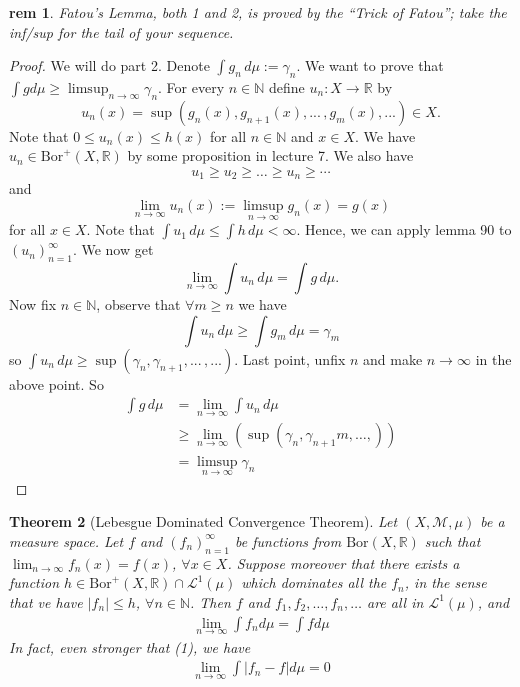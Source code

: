 \documentclass[letterpaper, 12pt]{article}
\newcommand{\fin}{\qquad \quad \hfill \framebox[1.75mm][l]{\,}}
\newcommand{\bR}{\mathbb{R}}
\newcommand{\bN}{\mathbb{N}}
\newcommand{\Bor}{\mathrm{Bor}}
\theoremstyle{stdthm}
\newtheorem{thm}{Theorem}[section]
\theoremstyle{stddef}
\newtheorem{rem}[thm]{rem} %
\theoremstyle{stdnonum}
\theoremstyle{stdqands}
\theoremstyle{stdbold}
\begin{document}
\begin{rem}
Fatou's Lemma, both 1 and 2, is proved by the ``Trick of Fatou''; take the inf/sup for the tail of your sequence. 
\end{rem}


\begin{proof}
We will do part 2. Denote $\int g_n \, d\mu := \gamma_n$. We want to prove that $\int g d\mu \geq \limsup_{n\rightarrow \infty} \gamma_n$. For every $n \in \bN$ define $u_n:X \rightarrow \bR$ by 
\[
u_n(x) = \sup(g_n(x), g_{n+1}(x),...\, , g_m(x),...) \in X.
\]
Note that $0 \leq u_n(x) \leq h(x)$ for all $n \in \bN$ and $x\in X$. We have $u_n \in \Bor^+(X,\bR)$ by some proposition in lecture 7. We also have 
\[
u_1 \geq u_2 \geq \dots \geq u_n \geq \cdots
\]
and
\[
\lim_{n\rightarrow \infty} u_n(x) := \limsup_{n\rightarrow \infty} g_n(x) = g(x)
\]
for all $x \in X$. Note that $\int u_1 \, d\mu \leq \int h \, d\mu < \infty$. Hence, we can apply lemma 90 to $(u_n)_{n=1}^\infty$. We now get 
\[
\lim_{n\rightarrow \infty} \int u_n \, d\mu = \int g \, d\mu.
\]
Now fix $n \in \bN$, observe that $\forall m \geq n$ we have
\[
\int u_n \, d\mu \geq \int g_m \, d\mu = \gamma_m
\]
so $\int u_n \, d\mu \geq \sup(\gamma_n,\gamma_{n+1}, ...\, , ...)$.
Last point, unfix $n$ and make $n\rightarrow \infty$ in the above point. So 
\begin{align*}
\int g \, d\mu &= \lim_{n\rightarrow \infty} \int u_n \, d\mu \\
&\geq \lim_{n\rightarrow \infty} (\sup (\gamma_n, \gamma_{n+1}m,\dots,))\\
&= \limsup_{n\rightarrow \infty} \gamma_n
\end{align*}
\end{proof}

\begin{thm}[Lebesgue Dominated Convergence Theorem]
Let $\left(X,\mathcal{M},\mu\right)$ be a measure space. Let $f$
and $\left(f_{n}\right)_{n=1}^{\infty}$ be functions from $\mbox{Bor}\left(X,\mathbb{R}\right)$
such that $\lim_{n\to\infty}f_{n}\left(x\right)=f\left(x\right)$,
$\forall x\in X$. Suppose moreover that there exists a function $h\in\mbox{Bor}^{+}\left(X,\mathbb{R}\right)\cap\mathcal{L}^{1}\left(\mu\right)$
which dominates all the $f_{n}$, in the sense that ve have $\left|f_{n}\right|\leq h$,
$\forall n\in\mathbb{N}$. Then $f$ and $f_{1},f_{2},\ldots,f_{n},\ldots$
are all in $\mathcal{L}^{1}\left(\mu\right)$, and
\begin{align*}
\lim_{n\to\infty}\int f_{n}d\mu=\int fd\mu \tag{1}
\end{align*}In fact, even stronger that (1), we have
\begin{align*}
\lim_{n\to\infty}\int\left|f_{n}-f\right|d\mu=0 \tag{2}
\end{align*}
\end{thm}
\end{document}
